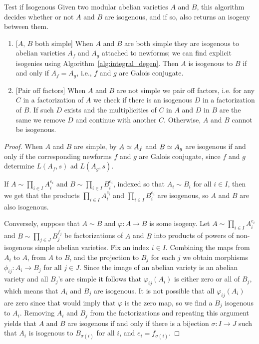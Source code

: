 \documentclass{article}
\begin{document}
\begin{algorithm}{Test if Isogenous}
    \label{alg:isogeny_testing}
    Given two modular abelian varieties $A$ and $B$, this algorithm decides
    whether or not $A$ and $B$ are isogenous, and if so, also returns an
    isogeny between them.
    \begin{enumerate}
        \item{} [$A$, $B$ both simple] When $A$ and $B$ are both simple they
            are isogenous to abelian varieties $A_f$ and $A_g$ attached to
            newforms; we can find explicit isogenies using
            Algorithm~\ref{alg:integral_degen}.
            Then $A$ is isogenous to $B$ if and only if $A_f = A_g$, i.e., $f$
            and $g$ are Galois conjugate.


        \item{} [Pair off factors] When $A$ and $B$ are not simple we pair off
            factors, i.e. for any $C$ in a factorization of $A$ we check if
            there is an isogenous $D$ in a factorization of $B$. If such $D$
            exists and the multiplicities of $C$ in $ A$ and $D$ in $B$ are the
            same we remove $D$ and continue with another $C$. Otherwise, $A$ and
            $B$ cannot be isogenous.
    \end{enumerate}
\end{algorithm}
\begin{proof}
    When $A$ and $B$ are simple, by \cite[\S5]{faltings:finiteness:1986}
    $A\simeq A_f$ and $B\simeq A_g$ are isogenous if and only if the
    corresponding newforms $f$ and $g$ are Galois conjugate,
    since $f$ and $g$ determine $L(A_f,s)$ ad $L(A_g,s)$.

    If $A \sim \prod_{i \in I} A_i^{e_i}$ and $B \sim \prod_{i \in I}
    B_i^{e_i}$, indexed so that $A_i \sim B_i$ for all $i \in I$, then we
    get that the products $\prod_{i \in I} A_i^{e_i}$ and $\prod_{i \in I}
    B_i^{e_i}$ are isogenous, so $A$ and $B$ are also isogenous.

    Conversely, suppose that $A \sim B$ and $\varphi: A \to B$ is some
    isogeny.  Let $A \sim \prod_{i \in I} A_i^{e_i}$ and $B \sim
    \prod_{j \in J} B_j^{f_j}$ be factorizations of $A$ and $B$ into
    products of powers of non-isogenous simple abelian varieties. Fix an
    index $i \in I$.  Combining the maps from $A_i$ to $A$, from $A$ to
    $B$, and the projection to $B_j$ for each $j$ we obtain morphisms
    $\phi_{ij}: A_i \to B_j$ for all $j \in J$. Since the image of an
    abelian variety is an abelian variety and all $B_j$'s are simple it
    follows that $\varphi_{ij}(A_i)$ is either zero or all of $B_j$,
    which means that $A_i$ and $B_j$ are isogenous. It is not possible
    that all $\varphi_{ij}(A_i)$ are zero since that would imply that
    $\varphi$ is the zero map, so we find a $B_j$ isogenous to
    $A_i$. Removing $A_i$ and $B_j$ from the factorizations and
    repeating this argument yields that $A$ and $B$ are isogenous if and
    only if there is a bijection $\sigma:I\to J$ such that $A_i$ is
    isogenous to $B_{\sigma(i)}$ for all $i$, and $e_i = f_{\sigma(i)}$.
\end{proof}
\end{document}

